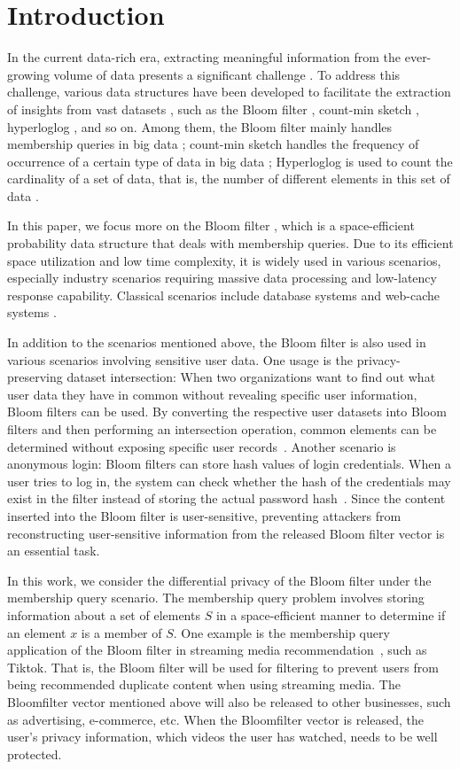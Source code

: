 \section{Introduction}

In the current data-rich era, extracting meaningful information from the ever-growing volume of data presents a significant challenge \cite{ss13}.
To address this challenge, various data structures have been developed to facilitate the extraction of insights from vast datasets \cite{c06}, such as the Bloom filter \cite{b70}, count-min sketch \cite{c09}, hyperloglog \cite{ffgm07}, and so on. Among them, the Bloom filter mainly handles membership queries in big data \cite{b70}; count-min sketch handles the frequency of occurrence of a certain type of data in big data \cite{c09}; Hyperloglog is used to count the cardinality of a set of data, that is, the number of different elements in this set of data \cite{ffgm07}.


In this paper, we focus more on the Bloom filter \cite{b70}, which is a space-efficient probability data structure that deals with membership queries. Due to its efficient space utilization and low time complexity, it is widely used in various scenarios, especially industry scenarios requiring massive data processing and low-latency response capability. Classical scenarios include database systems and web-cache systems \cite{g82, ngp09, ml16, pnbs20}. 


In addition to the scenarios mentioned above, the Bloom filter is also used in various scenarios involving sensitive user data. 
One usage is the privacy-preserving dataset intersection: When two organizations want to find out what user data they have in common without revealing specific user information, Bloom filters can be used. By converting the respective user datasets into Bloom filters and then performing an intersection operation, common elements can be determined without exposing specific user records~\cite{b13, js11}. 
Another scenario is anonymous login: Bloom filters can store hash values of login credentials. When a user tries to log in, the system can check whether the hash of the credentials may exist in the filter instead of storing the actual password hash~\cite{lvd11, bcmp20}. 
Since the content inserted into the Bloom filter is user-sensitive, preventing attackers from reconstructing user-sensitive information from the released Bloom filter vector is an essential task.

In this work, we consider the differential privacy of the Bloom filter under the membership query scenario. 
The membership query problem involves storing information about a set of elements $S$ in a space-efficient manner to determine if an element $x$ is a member of $S$.
One example is the membership query application of the Bloom filter in streaming media recommendation~\cite{wzwl+14}, such as Tiktok. 
That is, the Bloom filter will be used for filtering to prevent users from being recommended duplicate content when using streaming media.
The Bloomfilter vector mentioned above will also be released to other businesses, such as advertising, e-commerce, etc. When the Bloomfilter vector is released, the user's privacy information, which videos the user has watched, needs to be well protected.

